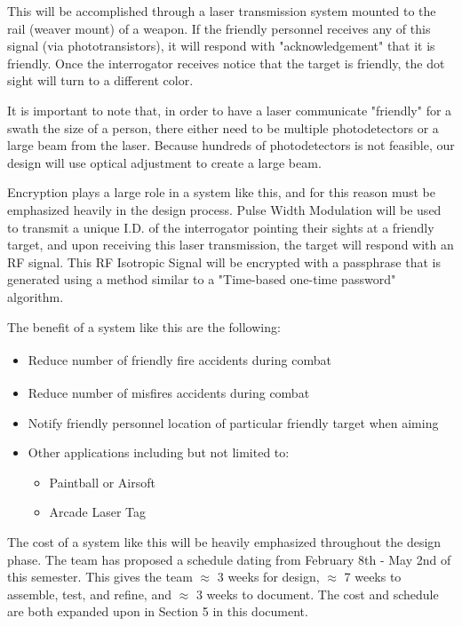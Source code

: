 \documentclass[openbib,letterpaper,10pt]{article}
\begin{document}
\begin{spacing}{1.15}
This will be accomplished through a laser transmission system mounted to the rail (weaver mount) of a weapon. If the friendly personnel receives any of this signal (via phototransistors), it will respond with "acknowledgement" that it is friendly. Once the interrogator receives notice that the target is friendly, the dot sight will turn to a different color.

It is important to note that, in order to have a laser communicate "friendly" for a swath the size of a person, there either need to be multiple photodetectors or a large beam from the laser. Because hundreds of photodetectors is not feasible, our design will use optical adjustment to create a large beam. 

Encryption plays a large role in a system like this, and for this reason must be emphasized heavily in the design process. Pulse Width Modulation will be used to transmit a unique I.D. of the interrogator pointing their sights at a friendly target, and upon receiving this laser transmission, the target will respond with an RF signal. This RF Isotropic Signal will be encrypted with a passphrase that is generated using a method similar to a "Time-based one-time password" algorithm.

The benefit of a system like this are the following:
\begin{itemize}
	\item Reduce number of friendly fire accidents during combat \textsuperscript{\cite{Garrison}}
	\item Reduce number of misfires accidents during combat \textsuperscript{\cite{Garrison}}
	\item Notify friendly personnel location of particular friendly target when aiming
	\item Other applications including but not limited to:
	\begin{itemize}
		\item Paintball or Airsoft
		\item Arcade Laser Tag
	\end{itemize}
\end{itemize}

The cost of a system like this will be heavily emphasized throughout the design phase. The team has proposed a schedule dating from February 8th - May 2nd of this semester. This gives the team $\approx$ 3 weeks for design, $\approx$ 7 weeks to assemble, test, and refine, and $\approx$ 3 weeks to document. The cost and schedule are both expanded upon in Section 5 in this document.\\


\end{spacing}
\end{document}
